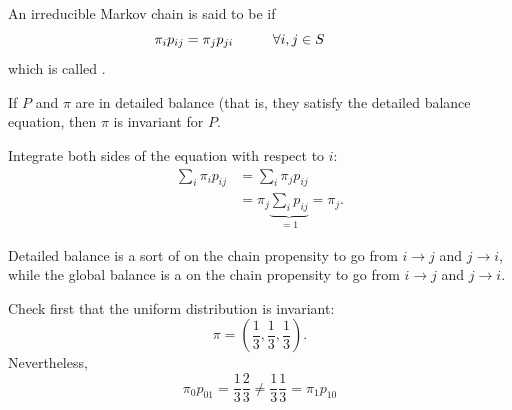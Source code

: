\documentclass{article}
\begin{document}
\begin{definition}
    An irreducible Markov chain is said to be  if 
\[
            \pi_i p_{ij} = \pi_j p_{ji} \hspace{1 cm} \forall i,j \in S  \hspace{1 cm} \]
        which is called .
\end{definition}\begin{proposition}
    If $P$ and $\pi$ are in detailed balance (that is, they satisfy the detailed balance equation, then $\pi$ is invariant for $P$.
\end{proposition}
    
    \begin{proof2}
        Integrate both sides of the equation with respect to $i$:
        \begin{align*}
            \sum_i\pi_ip_{ij}&= \sum_i\pi_jp_{ij}\\
            &=\pi_j\underbrace{\sum_ip_{ij}}_{=1}=\pi_j.
        \end{align*}
    \end{proof2}
Detailed balance is a sort of  on the chain propensity to go from $i\rightarrow j$ and $j \rightarrow i$, while the global balance is a  on the chain propensity to go from $i\rightarrow j$ and $j \rightarrow i$.
\begin{example}
     \begin{minipage}{0.5\textwidth}
     \center
    \end{minipage} \hfill
    \begin{minipage}{0.45\textwidth}
    Check first that the uniform distribution is invariant: \[\pi = (\frac{1}{3}, \frac{1}{3}, \frac{1}{3}).\] 
    Nevertheless, 
    \[
        \pi_0 p_{01} = \frac{1}{3} \frac{2}{3} \neq \frac{1}{3}\frac{1}{3} = \pi_1 p_{10}
    \]
    \end{minipage}
\end{example}
\end{document}
